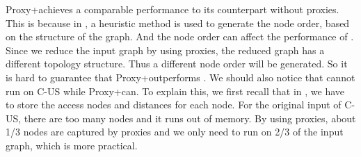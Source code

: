 Proxy+\tnr achieves a comparable performance to its counterpart without proxies. This is because in \tnr, a heuristic method is used to generate the node order, based on the structure of the graph. And the node order can affect the performance of \tnr. Since we reduce the input graph by using proxies, the reduced graph has a different topology structure. Thus a different node order will be generated. So it is hard to guarantee that Proxy+\tnr outperforms \tnr. We should also notice that \tnr cannot run on C-US while Proxy+\tnr can. To explain this, we first recall that in \tnr, we have to store the access nodes and distances for each node. For the original input of C-US, there are too many nodes and it runs out of memory. By using proxies, about 1/3 nodes are captured by proxies and we only need to run \tnr on 2/3 of the input graph, which is more practical.


